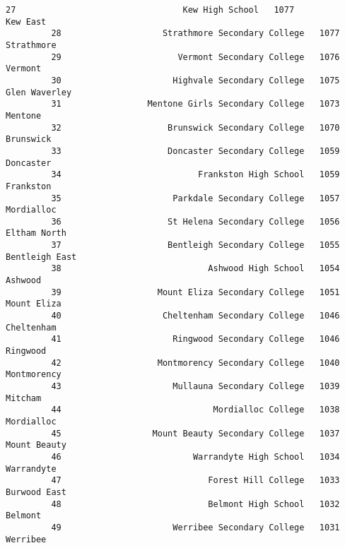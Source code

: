 \documentclass[11pt]{article}
\begin{document}
\begin{Verbatim}[commandchars=\\\{\}]
         27                                 Kew High School   1077           Kew East   
         28                    Strathmore Secondary College   1077         Strathmore   
         29                       Vermont Secondary College   1076            Vermont   
         30                      Highvale Secondary College   1075      Glen Waverley   
         31                 Mentone Girls Secondary College   1073            Mentone   
         32                     Brunswick Secondary College   1070          Brunswick   
         33                     Doncaster Secondary College   1059          Doncaster   
         34                           Frankston High School   1059          Frankston   
         35                      Parkdale Secondary College   1057         Mordialloc   
         36                     St Helena Secondary College   1056       Eltham North   
         37                     Bentleigh Secondary College   1055     Bentleigh East   
         38                             Ashwood High School   1054            Ashwood   
         39                   Mount Eliza Secondary College   1051        Mount Eliza   
         40                    Cheltenham Secondary College   1046         Cheltenham   
         41                      Ringwood Secondary College   1046           Ringwood   
         42                   Montmorency Secondary College   1040        Montmorency   
         43                      Mullauna Secondary College   1039            Mitcham   
         44                              Mordialloc College   1038         Mordialloc   
         45                  Mount Beauty Secondary College   1037       Mount Beauty   
         46                          Warrandyte High School   1034         Warrandyte   
         47                             Forest Hill College   1033       Burwood East   
         48                             Belmont High School   1032            Belmont   
         49                      Werribee Secondary College   1031           Werribee   
         

\end{Verbatim}
\end{document}
